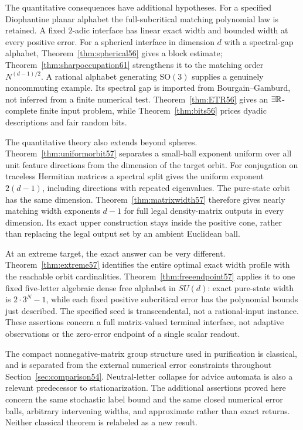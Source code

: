 The quantitative consequences have additional hypotheses. For a specified Diophantine planar alphabet the full-subcritical matching polynomial law is retained. A fixed $2$-adic interface has linear exact width and bounded width at every positive error. For a spherical interface in dimension $d$ with a spectral-gap alphabet, Theorem~\ref{thm:spherical56} gives a block estimate; Theorem~\ref{thm:sharpoccupation61} strengthens it to the matching order $N^{(d-1)/2}$. A rational alphabet generating $\mathrm{SO}(3)$ supplies a genuinely noncommuting example. Its spectral gap is imported from Bourgain--Gamburd, not inferred from a finite numerical test. Theorem~\ref{thm:ETR56} gives an $\exists\mathbb R$-complete finite input problem, while Theorem~\ref{thm:bits56} prices dyadic descriptions and fair random bits.


The quantitative theory also extends beyond spheres. Theorem~\ref{thm:uniformorbit57} separates a small-ball exponent uniform over all unit feature directions from the dimension of the target orbit. For conjugation on traceless Hermitian matrices a spectral split gives the uniform exponent $2(d-1)$, including directions with repeated eigenvalues. The pure-state orbit has the same dimension. Theorem~\ref{thm:matrixwidth57} therefore gives nearly matching width exponents $d-1$ for full legal density-matrix outputs in every dimension. Its exact upper construction stays inside the positive cone, rather than replacing the legal output set by an ambient Euclidean ball.

At an extreme target, the exact answer can be very different. Theorem~\ref{thm:extreme57} identifies the entire optimal exact width profile with the reachable orbit cardinalities. Theorem~\ref{thm:freeendpoint57} applies it to one fixed five-letter algebraic dense free alphabet in $SU(d)$: exact pure-state width is $2\cdot3^N-1$, while each fixed positive subcritical error has the polynomial bounds just described. The specified seed is transcendental, not a rational-input instance. These assertions concern a full matrix-valued terminal interface, not adaptive observations or the zero-error endpoint of a single scalar readout.

The compact nonnegative-matrix group structure used in purification is classical, and is separated from the external numerical error constraints throughout Section~\ref{sec:comparison54}. Neutral-letter collapse for advice automata is also a relevant predecessor to stationarization. The additional assertions proved here concern the same stochastic label bound and the same closed numerical error balls, arbitrary intervening widths, and approximate rather than exact returns. Neither classical theorem is relabeled as a new result.

